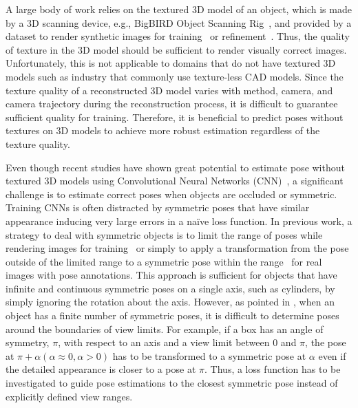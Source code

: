\documentclass[10pt,twocolumn,letterpaper]{article}
\begin{document}
A large body of work relies on the textured 3D model of an object, which is made by a 3D scanning device, e.g., BigBIRD Object Scanning Rig~\cite{alli2015YCB}, and provided by a dataset to render synthetic images for training~\cite{kehl2017ssd, Sundermeyer_2018_ECCV_implicit} or refinement~\cite{Li_2018_DeepIM, Manhardt_2018_ECCV_refinementTUM}. Thus, the quality of texture in the 3D model should be sufficient to render visually correct images. Unfortunately, this is not applicable to domains that do not have textured 3D models such as industry that commonly use texture-less CAD models. Since the texture quality of a reconstructed 3D model varies with method, camera, and camera trajectory during the reconstruction process, it is difficult to guarantee sufficient quality for training. Therefore, it is beneficial to predict poses without textures on 3D models to achieve more robust estimation regardless of the texture quality. 

Even though recent studies have shown great potential to estimate pose without textured 3D models using Convolutional Neural Networks (CNN)~\cite{cnn_pose:brachmann2016uncertainty_only_rgb,Do2018LieNetRM,rad2017bb8,Tekin_2018_CVPR}, a significant challenge is to estimate correct poses when objects are occluded or symmetric. Training CNNs is often distracted by symmetric poses that have similar appearance inducing very large errors in a na\"ive loss function. In previous work, a strategy to deal with symmetric objects is to limit the range of poses while rendering images for training~\cite{kehl2017ssd,Oberweger_2018_ECCV_heatmap} or simply to apply a transformation from the pose outside of the limited range to a symmetric pose within the range~\cite{rad2017bb8} for real images with pose annotations. This approach is sufficient for objects that have infinite and continuous symmetric poses on a single axis, such as cylinders, by simply ignoring the rotation about the axis. However, as pointed in \cite{rad2017bb8}, when an object has a finite number of symmetric poses, it is difficult to determine poses around the boundaries of view limits. For example, if a box has an angle of symmetry, $\pi$, with respect to an axis and a view limit between $0$ and $\pi$, the pose at $\pi+\alpha (\alpha \approx 0, \alpha > 0)$ has to be transformed to a symmetric pose at ${\alpha}$ even if the detailed appearance is closer to a pose at $\pi$. Thus, a loss function has to be investigated to guide pose estimations to the closest symmetric pose instead of explicitly defined view ranges. 
\end{document}
